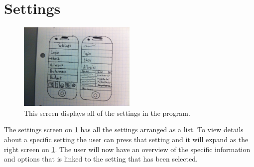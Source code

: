 \section{Settings}


\begin{figure}[H]
	\centering
    \includegraphics[width=0.5\textwidth]{Grafik/FoodPlanner/FinalSettingsSketch}
	\caption{This screen displays all of the settings in the program.}
	\label{SettingsScreen}
\end{figure}

The settings screen on \cref{SettingsScreen} has all the settings arranged as a list. To view details about a specific setting the user can press that setting and it will expand as the right screen on \cref{SettingsScreen}. The user will now have an overview of the specific information and options that is linked to the setting that has been selected.  